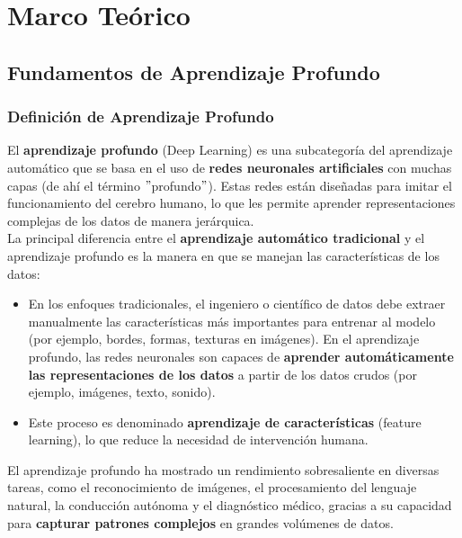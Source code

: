 \chapter{Marco Teórico}\label{ch:marco_teorico}

\section{Fundamentos de Aprendizaje Profundo}\label{sec:fundamentos_de_aprendizaje_profundo}
\subsection{Definición de Aprendizaje Profundo}\label{subsec:definicion_de_aprendizaje_profundo}
El \textbf{aprendizaje profundo} (Deep Learning) es una subcategoría del aprendizaje automático que se basa
en el uso de \textbf{redes neuronales artificiales} con muchas capas (de ahí el término \("\)profundo\("\)).
Estas redes están diseñadas para imitar el funcionamiento del cerebro humano, lo que les permite aprender
representaciones complejas de los datos de manera jerárquica. \\[2pt]

La principal diferencia entre el \textbf{aprendizaje automático tradicional} y el aprendizaje profundo es la manera en
que se manejan las características de los datos:
\begin{itemize}
    \item En los enfoques tradicionales, el ingeniero o científico de datos debe extraer manualmente las
características más importantes para entrenar al modelo (por ejemplo, bordes, formas, texturas en imágenes).
En el aprendizaje profundo, las redes neuronales son capaces de
\textbf{aprender automáticamente las representaciones de los datos} a partir de los datos crudos (por ejemplo,
imágenes, texto, sonido).
    \item Este proceso es denominado \textbf{aprendizaje de características} (feature learning), lo que reduce la
necesidad de intervención humana.
\end{itemize}

El aprendizaje profundo ha mostrado un rendimiento sobresaliente en diversas tareas, como el reconocimiento de
imágenes, el procesamiento del lenguaje natural, la conducción autónoma y el diagnóstico médico, gracias a su capacidad
para \textbf{capturar patrones complejos} en grandes volúmenes de datos.

